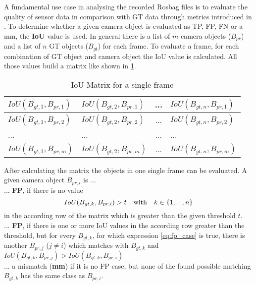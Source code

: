 A fundamental use case in analysing the recorded Rosbag files is to evaluate the quality of sensor data in comparison with GT data through metrics introduced in \cite{Reway}. 
To determine whether a given camera object is evaluated as \ac{TP}, \ac{FP}, \ac{FN} or a \ac{mm}, the \textbf{\ac{IoU}} value is used. 
In general there is a list of $m$ camera objects ($B_{pr}$) and a list of $n$ \ac{GT} objects ($B_{gt}$) for each frame. To evaluate a frame, for each combination of GT object and camera object the IoU value is calculated. All those values build a matrix like shown in \cref{tab:matrix}.
\begin{table}[h]
	\caption{IoU-Matrix for a single frame}
	\begin{tabularx}{\columnwidth}{X|X|c|X}
		\toprule
		$IoU(B_{gt,1}, B_{pr,1})$ & $IoU(B_{gt,2}, B_{pr,1})$ & ... & $IoU(B_{gt,n}, B_{pr,1})$ \\
		\midrule
		$IoU(B_{gt,1}, B_{pr,2})$ & $IoU(B_{gt,2}, B_{pr,2})$ & ... & $IoU(B_{gt,n}, B_{pr,2})$ \\
		\midrule
		... & ... & ... & ... \\
		\midrule		
		$IoU(B_{gt,1}, B_{pr,m})$ & $IoU(B_{gt,2}, B_{pr,m})$ & ... & $IoU(B_{gt,n}, B_{pr,m})$ \\
		\bottomrule
	\end{tabularx}
	\label{tab:matrix}
\end{table}

After calculating the matrix the objects in one single frame can be evaluated. A given camera object $B_{pr,i}$ is ... \\

... \textbf{FP}, if there is no value 
\begin{equation}
	IoU(B_{gt,k}, B_{pr,i}) > t \text{\quad with\quad} k \in \left\lbrace 1, ..., n\right\rbrace 
	\label{eq:fp_case}
\end{equation}
in the according row of the matrix which is greater than the given threshold $t$. \\

... \textbf{FP}, if there is one or more IoU values in the according row greater than the threshold, but for every $B_{gt,k}$, for which expression \cref{eq:fp_case} is true, there is another $B_{pr,j}$ ($j\neq i$) which matches with $B_{gt,k}$ and $IoU(B_{gt,k}, B_{pr,j}) > IoU(B_{gt,k}, B_{pr,i})$ \\

... a mismatch (\textbf{mm}) if it is no FP case, but none of the found possible matching $B_{gt,k}$ has the same class as $B_{pr,i}$. \\

